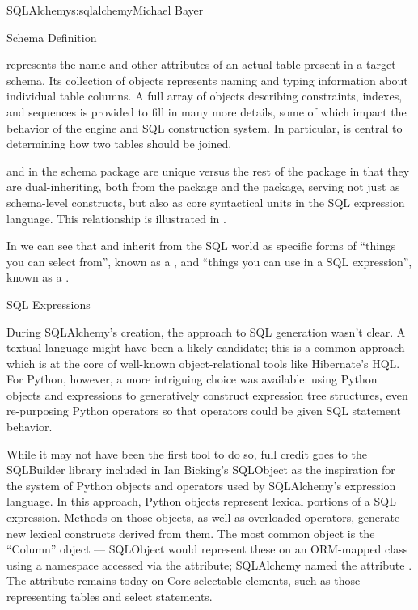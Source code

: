\begin{aosachapter}{SQLAlchemy}{s:sqlalchemy}{Michael Bayer}
\begin{aosasect1}{Schema Definition}

 represents the name and other attributes of an actual table
present in a target schema.  Its collection of  objects
represents naming and typing information about individual table columns.
A full array of objects describing constraints, indexes, and sequences
is provided to fill in many more details, some of which impact the
behavior of the engine and SQL construction system.  In particular, 
is central to determining how two tables should be joined.

 and  in the schema package are unique versus the rest of the
package in that they are dual-inheriting, both from the  package and
the  package, serving not just as schema-level
constructs, but also as core syntactical units in the SQL expression language.
This relationship is illustrated in .


In  we can see that  and  inherit from the SQL world as
specific forms of ``things you can select from'', known as a ,
and ``things you can use in a SQL expression'', known as a .

\end{aosasect1}

\begin{aosasect1}{SQL Expressions}

During SQLAlchemy's creation, the
approach to SQL generation wasn't clear. A textual
language might have been a likely candidate; this is a common
approach which is at the core of well-known object-relational tools
like Hibernate's HQL. For Python, however, a more intriguing
choice was available: using Python objects and expressions
to generatively construct expression tree structures, even
re-purposing Python operators so that operators
could be given SQL statement behavior.

While it may not have been the first tool to do so, full
credit goes to the SQLBuilder library included in Ian
Bicking's SQLObject as the inspiration for the
system of Python objects and operators used by
SQLAlchemy's expression language. In this approach,
Python objects represent lexical portions of a SQL
expression. Methods on those objects, as well as
overloaded operators, generate new lexical constructs
derived from them. The most common object is the ``Column''
object --- SQLObject would represent these on an ORM-mapped
class using a namespace accessed via the  attribute;
SQLAlchemy named the attribute . The 
attribute remains today on Core selectable elements,
such as those representing tables and select statements.


\end{aosasect1}
\end{aosachapter}
